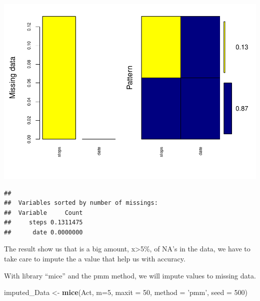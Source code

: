 \documentclass[]{article}
\newenvironment{Shaded}{\begin{snugshade}}{\end{snugshade}}
\newcommand{\DataTypeTok}[1]{\textcolor[rgb]{0.13,0.29,0.53}{#1}}
\newcommand{\DecValTok}[1]{\textcolor[rgb]{0.00,0.00,0.81}{#1}}
\newcommand{\KeywordTok}[1]{\textcolor[rgb]{0.13,0.29,0.53}{\textbf{#1}}}
\newcommand{\NormalTok}[1]{#1}
\newcommand{\StringTok}[1]{\textcolor[rgb]{0.31,0.60,0.02}{#1}}
\begin{document}
\includegraphics{PA1_template_files/figure-latex/Counting missing data-1.pdf}

\begin{verbatim}
## 
##  Variables sorted by number of missings: 
##  Variable     Count
##     steps 0.1311475
##      date 0.0000000
\end{verbatim}

The result show us that is a big amount, x\textgreater{}5\%, of NA's in
the data, we have to take care to impute the a value that help us with
accuracy.

With library ``mice'' and the pmm method, we will impute values to
missing data.

\begin{Shaded}
\begin{Highlighting}[]
\NormalTok{imputed_Data <-}\StringTok{ }\KeywordTok{mice}\NormalTok{(Act, }
                     \DataTypeTok{m=}\DecValTok{5}\NormalTok{, }
                     \DataTypeTok{maxit =} \DecValTok{50}\NormalTok{, }
                     \DataTypeTok{method =} \StringTok{'pmm'}\NormalTok{, }
                     \DataTypeTok{seed =} \DecValTok{500}\NormalTok{)}
\end{Highlighting}
\end{Shaded}
\end{document}
